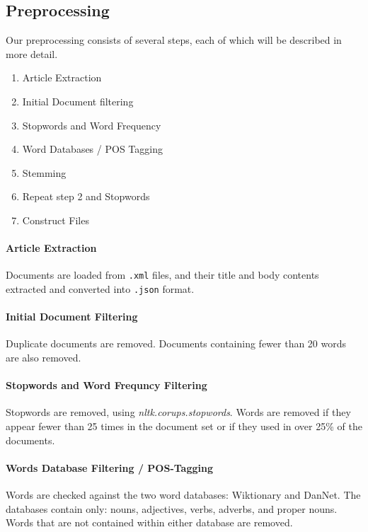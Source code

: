 \subsection{Preprocessing}\label{subsec:prepro}

Our preprocessing consists of several steps, each of which will be described in more detail.

\begin{enumerate}
	\item Article Extraction
	\item Initial Document filtering
	\item Stopwords and Word Frequency
	\item Word Databases / POS Tagging
	\item Stemming
	\item Repeat step 2 and Stopwords
	\item Construct Files
\end{enumerate}

\paragraph{Article Extraction}
Documents are loaded from \texttt{.xml} files, and their title and body contents extracted and converted into \texttt{.json} format.

\paragraph{Initial Document Filtering}
Duplicate documents are removed. Documents containing fewer than 20 words are also removed.

\paragraph{Stopwords and Word Frequncy Filtering}
Stopwords are removed, using \emph{nltk.corups.stopwords}. Words are removed if they appear fewer than 25 times in the document set or if they used in over 25\% of the documents.

\paragraph{Words Database Filtering / POS-Tagging}
Words are checked against the two word databases: Wiktionary and DanNet. The databases contain only: nouns, adjectives, verbs, adverbs, and proper nouns. Words that are not contained within either database are removed.


